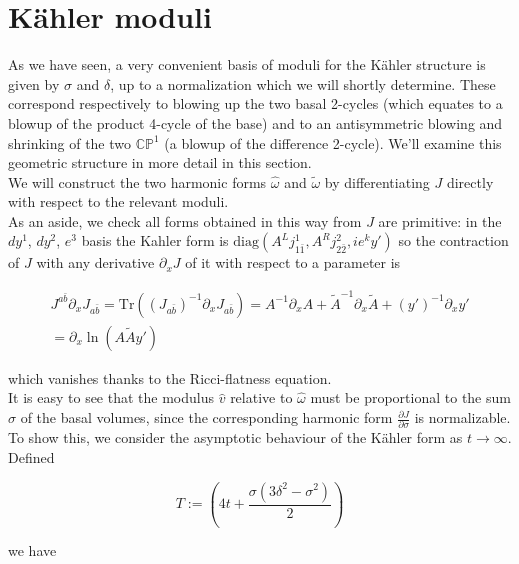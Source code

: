 \section{K\"ahler moduli}

As we have seen, a very convenient basis of moduli for the K\"ahler structure is given by $\sigma$ and $\delta$, up to a normalization which we will shortly determine. These correspond respectively to blowing up the two basal 2-cycles (which equates to a blowup of the product 4-cycle of the base) and to an antisymmetric blowing and shrinking of the two $\mathbb{CP}^1$ (a blowup of the difference 2-cycle). We'll examine this geometric structure in more detail in this section.\\

We will construct the two harmonic forms $\hat\omega$ and $\tilde\omega$ by differentiating $J$ directly with respect to the relevant moduli.\\

As an aside, we check all forms obtained in this way from $J$ are primitive: in the $dy^1$, $dy^2$, $e^3$ basis the Kahler form is $\mathrm{diag}(A^L j^1_{1\bar 1}, A^R j^2_{2\bar 2}, i e^k y')$ so the contraction of $J$ with any derivative $\partial_x J$ of it with respect to a parameter is

\begin{multline}
	J^{a\bar b}\partial_x J_{a\bar b} = \mathrm{Tr}\left( (J_{a\bar b})^{-1} \partial_x J_{a\bar b} \right) = A^{-1} \partial_x A + \tilde A^{-1} \partial_x \tilde A + (y')^{-1} \partial_x y' \\= \partial_x \ln \left( A \tilde A y' \right)	
	\label{}
\end{multline}

which vanishes thanks to the Ricci-flatness equation.\\

It is easy to see that the modulus $\hat v$ relative to $\hat \omega$ must be proportional to the sum $\sigma$ of the basal volumes, since the corresponding harmonic form $\frac{\partial J}{\partial \sigma}$ is normalizable. To show this, we consider the asymptotic behaviour of the K\"ahler form as $t\rightarrow \infty$. Defined

\begin{equation}
	T := \left( 4t + \frac{\sigma(3\delta^2 - \sigma^2)}{2} \right)
	\label{}
\end{equation}

we have



